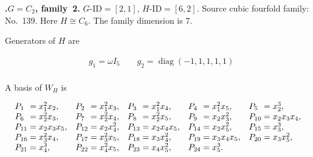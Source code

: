 \documentclass[12pt]{amsart}
\makeatletter
\numberwithin{equation}{section}
\theoremstyle{plain}
\theoremstyle{definition}
\theoremstyle{remark}
\DeclareMathOperator{\diag}{diag}
\newcommand{\PBasisLabel}[1]{\mathrlap{P_{#1}}\phantom{P_{99}}}
\newenvironment{SecEightAlignedBasis}[1]{%
  \begingroup\renewcommand{\arraystretch}{1.18}%
  \[\begin{array}{@{}#1@{}}%
}{\end{array}\]\endgroup}
\newenvironment{familydisplay}{%
  \begingroup
  \setlength{\arraycolsep}{1.35pt}%
  \renewcommand{\arraystretch}{0.96}%
  \setlength{\jot}{2pt}%
}{\endgroup}
\makeatother
\begin{document}
\par{}\medskip\noindent\textbf{.\enspace $G=C_2$, family~2.}\label{fam:threefold-no-35}
$G\text{-ID}=[2,1]$, $H\text{-ID}=[6,2]$.
Source cubic fourfold family: No.~139.  Here
$H\cong C_6$.
The family dimension is $7$.
\par\smallskip\noindent Generators of $H$ are\par\nopagebreak
\begin{familydisplay}
\begin{align*}
&g_{1}=\omega I_5
\qquad g_{2}=\diag(-1,1,1,1,1)\\
\end{align*}
\end{familydisplay}
\par\smallskip\noindent A basis of $W_H$ is\par\nopagebreak
\begin{familydisplay}
\begin{SecEightAlignedBasis}{l@{\quad}l@{\quad}l@{\quad}l@{\quad}l}
\PBasisLabel{1}=x_{1}^{2}x_{2}, & \PBasisLabel{2}=x_{1}^{2}x_{3}, & \PBasisLabel{3}=x_{1}^{2}x_{4}, & \PBasisLabel{4}=x_{1}^{2}x_{5}, & \PBasisLabel{5}=x_{2}^{3},\\
\PBasisLabel{6}=x_{2}^{2}x_{3}, & \PBasisLabel{7}=x_{2}^{2}x_{4}, & \PBasisLabel{8}=x_{2}^{2}x_{5}, & \PBasisLabel{9}=x_{2}x_{3}^{2}, & \PBasisLabel{10}=x_{2}x_{3}x_{4},\\
\PBasisLabel{11}=x_{2}x_{3}x_{5}, & \PBasisLabel{12}=x_{2}x_{4}^{2}, & \PBasisLabel{13}=x_{2}x_{4}x_{5}, & \PBasisLabel{14}=x_{2}x_{5}^{2}, & \PBasisLabel{15}=x_{3}^{3},\\
\PBasisLabel{16}=x_{3}^{2}x_{4}, & \PBasisLabel{17}=x_{3}^{2}x_{5}, & \PBasisLabel{18}=x_{3}x_{4}^{2}, & \PBasisLabel{19}=x_{3}x_{4}x_{5}, & \PBasisLabel{20}=x_{3}x_{5}^{2},\\
\PBasisLabel{21}=x_{4}^{3}, & \PBasisLabel{22}=x_{4}^{2}x_{5}, & \PBasisLabel{23}=x_{4}x_{5}^{2}, & \multicolumn{2}{@{}l@{}}{\PBasisLabel{24}=x_{5}^{3}.}
\end{SecEightAlignedBasis}
\end{familydisplay}
\end{document}
